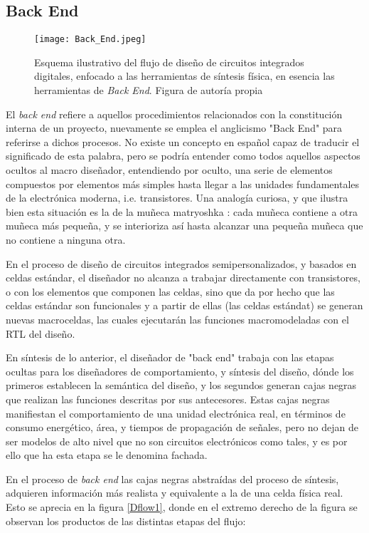 \newpage
\subsection{Back End}

\begin{figure}[h]
\texttt{[image: Back\_End.jpeg]}
\centering
\caption{Esquema ilustrativo del flujo de diseño de circuitos integrados digitales, enfocado a las herramientas de síntesis física, en esencia las herramientas de \textit{Back End}. Figura de autoría propia}
\label{be}
\end{figure}

El \textit{back end} refiere a aquellos procedimientos relacionados con la constitución interna de un proyecto, nuevamente se emplea el anglicismo "Back End" para referirse a dichos procesos. No existe un concepto en español capaz de traducir el significado de esta palabra, pero se podría entender como todos aquellos aspectos ocultos al macro diseñador, entendiendo por oculto, una serie de elementos compuestos por elementos más simples hasta llegar a las unidades fundamentales de la electrónica moderna, i.e. transistores. Una analogía curiosa, y que ilustra bien esta situación es la de la muñeca matryoshka \cite{book:matryoshka}: cada muñeca contiene a otra muñeca más pequeña, y se interioriza así hasta alcanzar una pequeña muñeca que no contiene a ninguna otra.

En el proceso de diseño de circuitos integrados semipersonalizados, y basados en celdas estándar, el diseñador no alcanza a trabajar directamente con transistores, o con los elementos que componen las celdas, sino  que da por hecho que las celdas estándar son funcionales y a partir de ellas (las celdas estándat) se generan nuevas macroceldas, las cuales ejecutarán las funciones macromodeladas con el RTL del diseño.

En síntesis de lo anterior, el diseñador de "back end" trabaja con las etapas ocultas para los diseñadores de comportamiento, y síntesis del diseño, dónde los primeros establecen la semántica del diseño, y los segundos generan cajas negras que realizan las funciones descritas por sus antecesores. Estas cajas negras manifiestan el comportamiento de una unidad electrónica real, en términos de consumo energético, área, y tiempos de propagación de señales, pero no dejan de ser modelos de alto nivel que no son circuitos electrónicos como tales, y es por ello que ha esta etapa se le denomina fachada.

En el proceso de \textit{back end} las cajas negras abstraídas del proceso de síntesis, adquieren información más realista y equivalente a la de una celda física real. Esto se aprecia en la figura \ref{Dflow1}, donde en el extremo derecho de la figura se observan los productos de las distintas etapas del flujo: 

